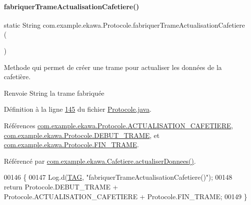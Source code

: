\paragraph{\texorpdfstring{fabriquer\+Trame\+Actualisation\+Cafetiere()}{fabriquerTrameActualisationCafetiere()}}
{\footnotesize\ttfamily static String com.\+example.\+ekawa.\+Protocole.\+fabriquer\+Trame\+Actualisation\+Cafetiere (\begin{DoxyParamCaption}{ }\end{DoxyParamCaption})\hspace{0.3cm}{\ttfamily [static]}}



Methode qui permet de créer une trame pour actualiser les données de la cafetière. 

\begin{DoxyReturn}{Renvoie}
String la trame fabriquée 
\end{DoxyReturn}


Définition à la ligne \hyperlink{_protocole_8java_source_l00145}{145} du fichier \hyperlink{_protocole_8java_source}{Protocole.\+java}.



Références \hyperlink{_protocole_8java_source_l00034}{com.\+example.\+ekawa.\+Protocole.\+A\+C\+T\+U\+A\+L\+I\+S\+A\+T\+I\+O\+N\+\_\+\+C\+A\+F\+E\+T\+I\+E\+RE}, \hyperlink{_protocole_8java_source_l00025}{com.\+example.\+ekawa.\+Protocole.\+D\+E\+B\+U\+T\+\_\+\+T\+R\+A\+ME}, et \hyperlink{_protocole_8java_source_l00026}{com.\+example.\+ekawa.\+Protocole.\+F\+I\+N\+\_\+\+T\+R\+A\+ME}.



Référencé par \hyperlink{_cafetiere_8java_source_l00495}{com.\+example.\+ekawa.\+Cafetiere.\+actualiser\+Donnees()}.


\begin{DoxyCode}
00146     \{
00147         Log.d(\hyperlink{classcom_1_1example_1_1ekawa_1_1_protocole_ae9b68fa0daac528421b887f19413f8f5}{TAG}, \textcolor{stringliteral}{"fabriquerTrameActualisationCafetiere()"});
00148         \textcolor{keywordflow}{return} Protocole.DEBUT\_TRAME + Protocole.ACTUALISATION\_CAFETIERE + Protocole.FIN\_TRAME;
00149     \}
\end{DoxyCode}
\mbox{\label{classcom_1_1example_1_1ekawa_1_1_protocole_a4a7fde713ecc0e7d8653f4610b58f1bf}} 
